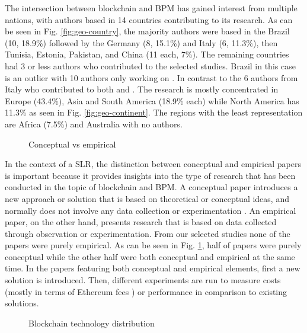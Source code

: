 The intersection between blockchain and BPM has gained interest from multiple nations, with authors based in 14 countries contributing to its research. As can be seen in Fig. \ref{fig:geo-country}, the majority authors were based in the Brazil (10, 18.9\%) followed by the Germany (8, 15.1\%) and Italy (6, 11.3\%), then Tunisia, Estonia, Pakistan, and China (11 each, 7\%). The remaining countries had 3 or less authors who contributed to the selected studies. Brazil in this case is an outlier with 10 authors only working on \citeauthor{alves_exploring_2022} \cite{alves_exploring_2022}. In contrast to the 6 authors from Italy who contributed to both \citeauthor{corradini_engineering_2022} \cite{corradini_engineering_2022} and \citeauthor{corradini_flexible_2022} \cite{corradini_flexible_2022}. The research is mostly concentrated in Europe (43.4\%), Asia and South America (18.9\% each) while North America has 11.3\% as seen in Fig. \ref{fig:geo-continent}. The regions with the least representation are Africa (7.5\%) and Australia with no authors.
\begin{figure}[!h]
    \centering
    \caption{Conceptual vs empirical}
    \label{fig:concept}
\end{figure}

In the context of a SLR, the distinction between conceptual and empirical papers is important because it provides insights into the type of research that has been conducted in the topic of blockchain and BPM. A conceptual paper introduces a new approach or solution that is based on theoretical or conceptual ideas, and normally does not involve any data collection or experimentation \cite{frizzo-barker_blockchain_2020}. An empirical paper, on the other hand, presents research that is based on data collected through observation or experimentation. From our selected studies none of the papers were purely empirical. As can be seen in Fig. \ref{fig:concept}, half of papers were purely conceptual while the other half were both conceptual and empirical at the same time. In the papers featuring both conceptual and empirical elements, first a new solution is introduced. Then, different experiments are run to measure costs (mostly in terms of Ethereum fees \cite{eth}) or performance in comparison to existing solutions.
\begin{figure}
    \centering
    \caption{Blockchain technology distribution}
    \label{fig:blockchain}
\end{figure}

